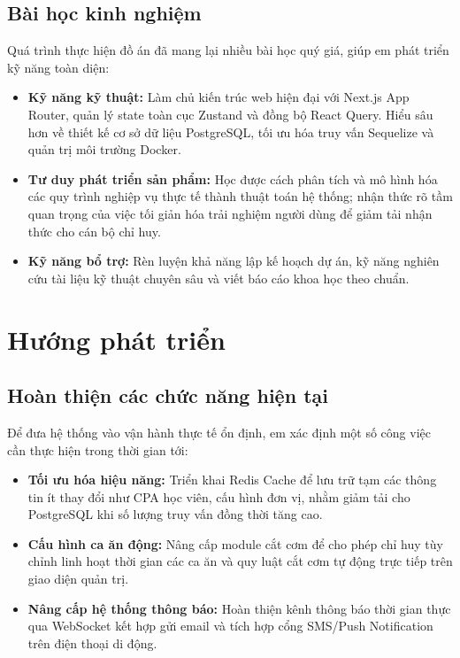 \documentclass[../DoAn.tex]{subfiles}
\begin{document}
\subsection{Bài học kinh nghiệm}
Quá trình thực hiện đồ án đã mang lại nhiều bài học quý giá, giúp em phát triển kỹ năng toàn diện:
\begin{itemize}
    \item \textbf{Kỹ năng kỹ thuật:} Làm chủ kiến trúc web hiện đại với Next.js App Router, quản lý state toàn cục Zustand và đồng bộ React Query. Hiểu sâu hơn về thiết kế cơ sở dữ liệu PostgreSQL, tối ưu hóa truy vấn Sequelize và quản trị môi trường Docker.
    \item \textbf{Tư duy phát triển sản phẩm:} Học được cách phân tích và mô hình hóa các quy trình nghiệp vụ thực tế thành thuật toán hệ thống; nhận thức rõ tầm quan trọng của việc tối giản hóa trải nghiệm người dùng để giảm tải nhận thức cho cán bộ chỉ huy.
    \item \textbf{Kỹ năng bổ trợ:} Rèn luyện khả năng lập kế hoạch dự án, kỹ năng nghiên cứu tài liệu kỹ thuật chuyên sâu và viết báo cáo khoa học theo chuẩn.
\end{itemize}

\section{Hướng phát triển}

\subsection{Hoàn thiện các chức năng hiện tại}
Để đưa hệ thống vào vận hành thực tế ổn định, em xác định một số công việc cần thực hiện trong thời gian tới:
\begin{itemize}
    \item \textbf{Tối ưu hóa hiệu năng:} Triển khai Redis Cache để lưu trữ tạm các thông tin ít thay đổi như CPA học viên, cấu hình đơn vị, nhằm giảm tải cho PostgreSQL khi số lượng truy vấn đồng thời tăng cao.
    \item \textbf{Cấu hình ca ăn động:} Nâng cấp module cắt cơm để cho phép chỉ huy tùy chỉnh linh hoạt thời gian các ca ăn và quy luật cắt cơm tự động trực tiếp trên giao diện quản trị.
    \item \textbf{Nâng cấp hệ thống thông báo:} Hoàn thiện kênh thông báo thời gian thực qua WebSocket kết hợp gửi email và tích hợp cổng SMS/Push Notification trên điện thoại di động.
\end{itemize}
\end{document}

